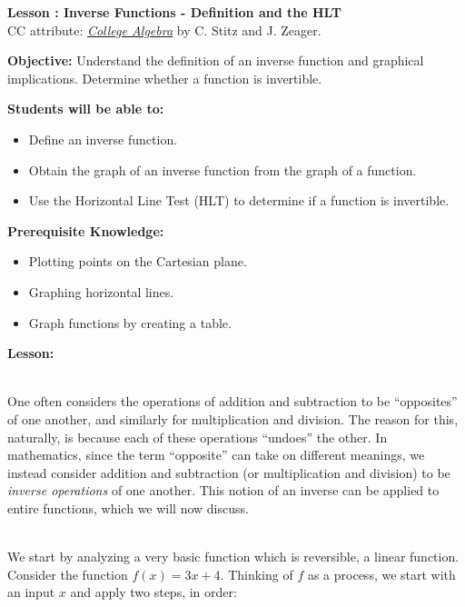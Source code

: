 \documentclass[12pt]{article}
\theoremstyle{definition}
\begin{document}
{\bf \large Lesson 
: Inverse Functions - Definition and the HLT}
\\ CC attribute: \href{http://www.stitz-zeager.com}{\it{College Algebra}} by C. Stitz and J. Zeager. 
\hfill \doclicenseImage[imagewidth=5em]\\
\par
{\bf Objective:} 	Understand the definition of an inverse function and graphical implications.  Determine whether a function is invertible.\\  
\par
{\bf Students will be able to:}
\begin{itemize}
	\item Define an inverse function.
	\item Obtain the graph of an inverse function from the graph of a function.
	\item Use the Horizontal Line Test (HLT) to determine if a function is invertible.
\end{itemize}
{\bf Prerequisite Knowledge:}
\begin{itemize}
	\item Plotting points on the Cartesian plane.
	\item Graphing horizontal lines.
	\item Graph functions by creating a table.
\end{itemize}
\hrulefill

{\bf Lesson:}\\
\ \par
One often considers the operations of addition and subtraction to be ``opposites'' of one another, and similarly for multiplication and division.  The reason for this, naturally, is because each of these operations ``undoes'' the other.  In mathematics, since the term ``opposite'' can take on different meanings, we instead consider addition and subtraction (or multiplication and division) to be {\it inverse operations} of one another.  This notion of an inverse can be applied to entire functions, which we will now discuss.\\
\ \par
We start by analyzing a very basic function which is reversible, a linear function.  Consider the function $f(x) = 3x+4$.  Thinking of $f$ as a process, we start with an input $x$ and apply two steps, in order: 
\end{document}
